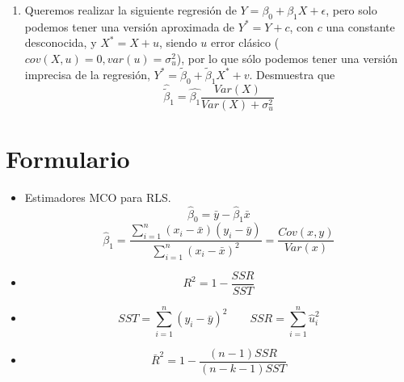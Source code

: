 \documentclass[10pt,a4paper]{article}
\begin{document}
\begin{enumerate}
\begin{enumerate}
\end{enumerate}

\item Queremos realizar la siguiente regresión de $Y=\beta_0+\beta_1X+\epsilon$, pero solo podemos tener una versión aproximada de $Y^*=Y+c$, con $c$ una constante desconocida, y $X^*=X+u$, siendo $u$ error clásico ($cov(X,u)=0, var(u)=\sigma^2_u$), por lo que sólo podemos tener una versión imprecisa de la regresión, $Y^* = \tilde\beta_0+\tilde\beta_1X^*+v$. Desmuestra que 
$$\hat{\tilde\beta}_1=\hat{\beta_1}\frac{Var(X)}{Var(X)+\sigma^2_u}$$

\end{enumerate}


\section{Formulario}
\begin{itemize}

\item  Estimadores MCO para RLS.
{
$$\hat{\beta}_0 = \bar{y} - \hat{\beta}_1 \bar{x} $$
$$\hat{\beta}_1 = \frac{\sum_{i=1}^{n}(x_i - \bar{x})(y_i-\bar{y})}{\sum_{i=1}^{n}(x_i - \bar{x})^2}=\frac{Cov(x,y)}{Var(x)}$$}

\item \[ R^2  = 1 - \frac{SSR}{SST} \] 
\item  $$SST = \sum_{i=1}^{n} (y_i - \bar{y})^2 \quad \quad SSR = \sum_{i=1}^{n}  \hat{u}_i^2 $$
    \item \[ \bar{R}^2 =  1 - \frac{(n-1)SSR}{(n-k-1)SST} \]

\end{itemize}
\end{document}
